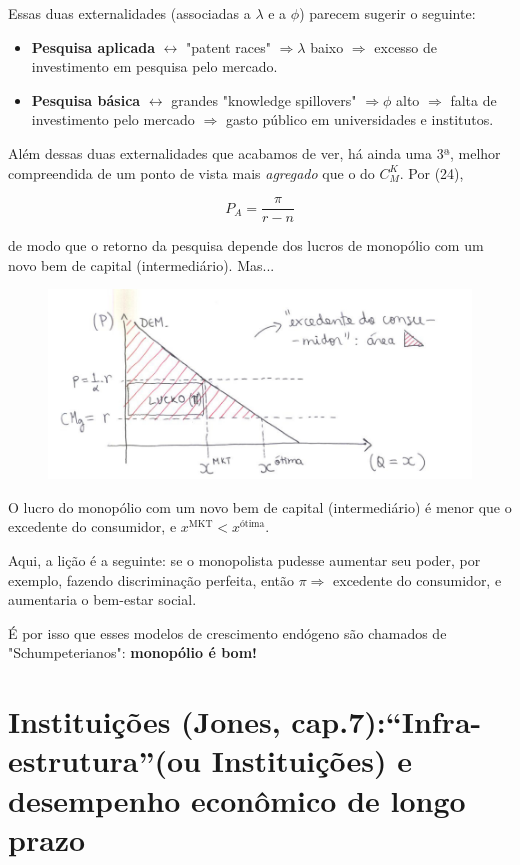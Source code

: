 \documentclass[a4paper,12pt]{article}[abntex2]
\begin{document}
Essas duas externalidades (associadas a $\lambda$ e a $\phi$) parecem sugerir o seguinte:

\begin{itemize}
    \item \textbf{Pesquisa aplicada} $\leftrightarrow$ "patent races" $\Rightarrow \lambda$ baixo $\Rightarrow$ excesso de investimento em pesquisa pelo mercado.
    \item \textbf{Pesquisa básica} $\leftrightarrow$ grandes "knowledge spillovers" $\Rightarrow \phi$ alto $\Rightarrow$ falta de investimento pelo mercado $\Rightarrow$ gasto público em universidades e institutos.
\end{itemize}

Além dessas duas externalidades que acabamos de ver, há ainda uma 3ª, melhor compreendida de um ponto de vista mais \textit{agregado} que o do $C_M^K$. Por (24),

\[
P_A = \frac{\pi}{r - n}
\]

de modo que o retorno da pesquisa depende dos lucros de monopólio com um novo bem de capital (intermediário). Mas...


\begin{figure}[H]
    \centering
    \includegraphics[width=0.7\linewidth]{Imagens/a16i1.png}
\end{figure}


O lucro do monopólio com um novo bem de capital (intermediário) é menor que o excedente do consumidor, e $x^{\text{MKT}} < x^{\text{ótima}}$.

Aqui, a lição é a seguinte: se o monopolista pudesse aumentar seu poder, por exemplo, fazendo discriminação perfeita, então $\pi \Rightarrow$ excedente do consumidor, e aumentaria o bem-estar social.

É por isso que esses modelos de crescimento endógeno são chamados de "Schumpeterianos": \textbf{monopólio é bom!}

\newpage
\section{\textbf{Instituições (Jones, cap.7)}:“Infra-estrutura”(ou Instituições) e desempenho econômico de longo prazo}
\end{document}
